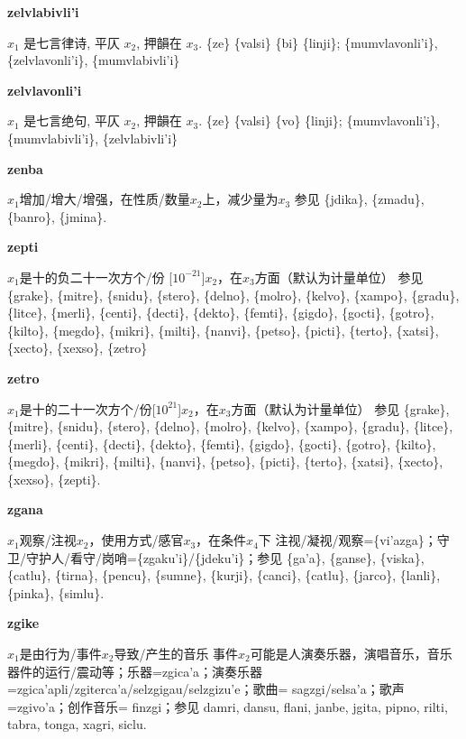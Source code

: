 \documentclass[notitlepage,twocolumn,a4paper,10pt]{book}
\begin{document}
{\sffamily\bfseries zelvlabivli'i} $x_1$ 是七言律诗, 平仄 $x_2$, 押韻在 $x_3$. \textemdash{} \{ze\} \{valsi\} \{bi\} \{linji\}; \{mumvlavonli'i\}, \{zelvlavonli'i\}, \{mumvlabivli'i\}

{\sffamily\bfseries zelvlavonli'i} $x_1$ 是七言绝句, 平仄 $x_2$, 押韻在 $x_3$. \textemdash{} \{ze\} \{valsi\} \{vo\} \{linji\}; \{mumvlavonli'i\}, \{mumvlabivli'i\}, \{zelvlabivli'i\}

{\sffamily\bfseries zenba}\enspace {\ttfamily\bfseries[zen     ze'a]}  $x_1$增加\slash{}增大\slash{}增强，在性质\slash{}数量$x_2$上，减少量为$x_3$ \textemdash{} 参见 \{jdika\}, \{zmadu\}, \{banro\}, \{jmina\}.

{\sffamily\bfseries zepti}\enspace {\ttfamily\bfseries[zep]}  $x_1$是十的负二十一次方个\slash{}份 [$10^{-21}$]$x_2$，在$x_3$方面（默认为计量单位） \textemdash{} 参见 \{grake\}, \{mitre\}, \{snidu\}, \{stero\}, \{delno\}, \{molro\}, \{kelvo\}, \{xampo\}, \{gradu\}, \{litce\}, \{merli\}, \{centi\}, \{decti\}, \{dekto\}, \{femti\}, \{gigdo\}, \{gocti\}, \{gotro\}, \{kilto\}, \{megdo\}, \{mikri\}, \{milti\}, \{nanvi\}, \{petso\}, \{picti\}, \{terto\}, \{xatsi\}, \{xecto\}, \{xexso\}, \{zetro\}

{\sffamily\bfseries zetro}\enspace {\ttfamily\bfseries[zet]}  $x_1$是十的二十一次方个\slash{}份[$10^{21}$]$x_2$，在$x_3$方面（默认为计量单位） \textemdash{} 参见 \{grake\}, \{mitre\}, \{snidu\}, \{stero\}, \{delno\}, \{molro\}, \{kelvo\}, \{xampo\}, \{gradu\}, \{litce\}, \{merli\}, \{centi\}, \{decti\}, \{dekto\}, \{femti\}, \{gigdo\}, \{gocti\}, \{gotro\}, \{kilto\}, \{megdo\}, \{mikri\}, \{milti\}, \{nanvi\}, \{petso\}, \{picti\}, \{terto\}, \{xatsi\}, \{xecto\}, \{xexso\}, \{zepti\}.

{\sffamily\bfseries zgana}\enspace {\ttfamily\bfseries[    zga]}  $x_1$观察\slash{}注视$x_2$，使用方式\slash{}感官$x_3$，在条件$x_4$下 \textemdash{} 注视\slash{}凝视\slash{}观察=\{vi'azga\}；守卫\slash{}守护人\slash{}看守\slash{}岗哨=\{zgaku'i\}\slash{}\{jdeku'i\}；参见 \{ga'a\}, \{ganse\}, \{viska\}, \{catlu\}, \{tirna\}, \{pencu\}, \{sumne\}, \{kurji\}, \{canci\}, \{catlu\}, \{jarco\}, \{lanli\}, \{pinka\}, \{simlu\}.

{\sffamily\bfseries zgike}\enspace {\ttfamily\bfseries[    zgi gi'e]}  $x_1$是由行为\slash{}事件$x_2$导致\slash{}产生的音乐 \textemdash{} 事件$x_2$可能是人演奏乐器，演唱音乐，音乐器件的运行\slash{}震动等；乐器={zgica'a}；演奏乐器={zgica'apli}\slash{}{zgiterca'a}\slash{}{selzgigau}\slash{}{selzgizu'e}；歌曲= {sagzgi}\slash{}{selsa'a}；歌声={zgivo'a}；创作音乐= {finzgi}；参见 {damri}, {dansu}, {flani}, {janbe}, {jgita}, {pipno}, {rilti}, {tabra}, {tonga}, {xagri}, {siclu}.
\end{document}

